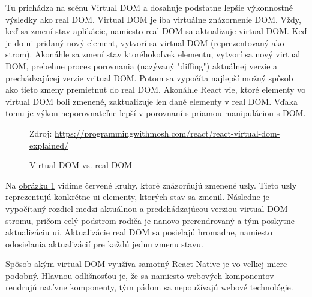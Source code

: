 Tu prichádza na scénu Virtual DOM a dosahuje podstatne lepšie výkonnostné výsledky ako real DOM. Virtual DOM je iba virtuálne znázornenie DOM. Vždy, keď sa zmení stav aplikácie, namiesto real DOM sa aktualizuje virtual DOM. Keď je do \acrshort{ui} pridaný nový element, vytvorí sa virtual DOM (reprezentovaný ako strom). Akonáhle sa zmení stav ktoréhokoľvek elementu, vytvorí sa nový virtual DOM, prebehne proces porovnania (nazývaný "diffing") aktuálnej verzie a prechádzajúcej verzie vritual DOM. Potom sa vypočíta najlepší možný spôsob ako tieto zmeny premietnuť do real DOM. Akonáhle React vie, ktoré elementy vo virtual DOM boli zmenené, zaktualizuje len dané elementy v real DOM. Vďaka tomu je výkon neporovnateľne lepší v porovnaní s priamou manipuláciou s DOM.

\begin{figure}[!htbp]
  \centering  
  \def\stackalignment{c}
           {\scriptsize%
            Zdroj: \url{https://programmingwithmosh.com/react/react-virtual-dom-explained/}}
	\caption{Virtual DOM vs. real DOM}  
  \label{domImg}
\end{figure}
Na \hyperref[domImg]{obrázku \ref{domImg}} vidíme červené kruhy, ktoré znázorňujú zmenené uzly. Tieto uzly reprezentujú konkrétne \acrshort{ui} elementy, ktorých stav sa zmenil. Následne je vypočítaný rozdiel medzi aktuálnou a predchádzajúcou verziou virtual DOM stromu, pričom celý podstrom rodiča je nanovo prerendrovaný a tým poskytne aktualizáciu \acrshort{ui}. Aktualizácie real DOM sa posielajú hromadne, namiesto odosielania aktualizácií pre každú jednu zmenu stavu.

Spôsob akým virtual DOM využíva samotný React Native je vo veľkej miere podobný. Hlavnou odlišnosťou je, že sa namiesto webových komponentov rendrujú natívne komponenty, tým pádom sa nepoužívajú webové technológie. \\

